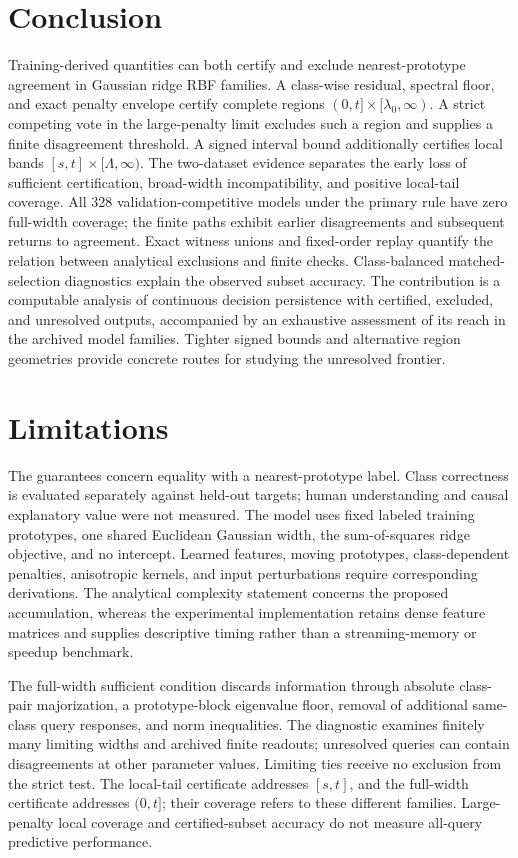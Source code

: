 \documentclass[preprint,12pt,authoryear]{elsarticle}
\begin{document}
\section{Conclusion}
Training-derived quantities can both certify and exclude nearest-prototype agreement in Gaussian ridge RBF families. A class-wise residual, spectral floor, and exact penalty envelope certify complete regions $(0,t]\times[\lambda_0,\infty)$. A strict competing vote in the large-penalty limit excludes such a region and supplies a finite disagreement threshold. A signed interval bound additionally certifies local bands $[s,t]\times[\Lambda,\infty)$. The two-dataset evidence separates the early loss of sufficient certification, broad-width incompatibility, and positive local-tail coverage. All 328 validation-competitive models under the primary rule have zero full-width coverage; the finite paths exhibit earlier disagreements and subsequent returns to agreement. Exact witness unions and fixed-order replay quantify the relation between analytical exclusions and finite checks. Class-balanced matched-selection diagnostics explain the observed subset accuracy. The contribution is a computable analysis of continuous decision persistence with certified, excluded, and unresolved outputs, accompanied by an exhaustive assessment of its reach in the archived model families. Tighter signed bounds and alternative region geometries provide concrete routes for studying the unresolved frontier.

\section{Limitations}
The guarantees concern equality with a nearest-prototype label. Class correctness is evaluated separately against held-out targets; human understanding and causal explanatory value were not measured. The model uses fixed labeled training prototypes, one shared Euclidean Gaussian width, the sum-of-squares ridge objective, and no intercept. Learned features, moving prototypes, class-dependent penalties, anisotropic kernels, and input perturbations require corresponding derivations. The analytical complexity statement concerns the proposed accumulation, whereas the experimental implementation retains dense feature matrices and supplies descriptive timing rather than a streaming-memory or speedup benchmark.

The full-width sufficient condition discards information through absolute class-pair majorization, a prototype-block eigenvalue floor, removal of additional same-class query responses, and norm inequalities. The diagnostic examines finitely many limiting widths and archived finite readouts; unresolved queries can contain disagreements at other parameter values. Limiting ties receive no exclusion from the strict test. The local-tail certificate addresses $[s,t]$, and the full-width certificate addresses $(0,t]$; their coverage refers to these different families. Large-penalty local coverage and certified-subset accuracy do not measure all-query predictive performance.
\end{document}
